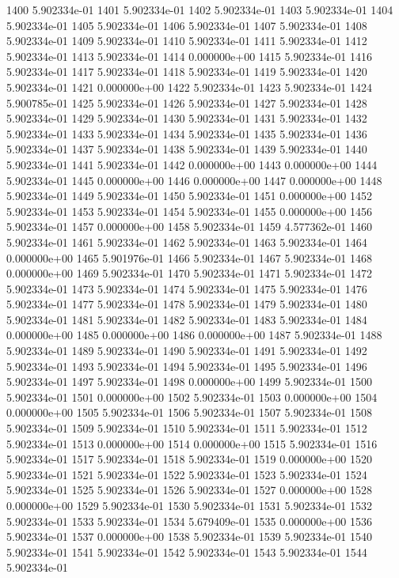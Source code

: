 \documentclass{article}
\begin{document}
\begin{Schunk}
\begin{Soutput}
1400 5.902334e-01
1401 5.902334e-01
1402 5.902334e-01
1403 5.902334e-01
1404 5.902334e-01
1405 5.902334e-01
1406 5.902334e-01
1407 5.902334e-01
1408 5.902334e-01
1409 5.902334e-01
1410 5.902334e-01
1411 5.902334e-01
1412 5.902334e-01
1413 5.902334e-01
1414 0.000000e+00
1415 5.902334e-01
1416 5.902334e-01
1417 5.902334e-01
1418 5.902334e-01
1419 5.902334e-01
1420 5.902334e-01
1421 0.000000e+00
1422 5.902334e-01
1423 5.902334e-01
1424 5.900785e-01
1425 5.902334e-01
1426 5.902334e-01
1427 5.902334e-01
1428 5.902334e-01
1429 5.902334e-01
1430 5.902334e-01
1431 5.902334e-01
1432 5.902334e-01
1433 5.902334e-01
1434 5.902334e-01
1435 5.902334e-01
1436 5.902334e-01
1437 5.902334e-01
1438 5.902334e-01
1439 5.902334e-01
1440 5.902334e-01
1441 5.902334e-01
1442 0.000000e+00
1443 0.000000e+00
1444 5.902334e-01
1445 0.000000e+00
1446 0.000000e+00
1447 0.000000e+00
1448 5.902334e-01
1449 5.902334e-01
1450 5.902334e-01
1451 0.000000e+00
1452 5.902334e-01
1453 5.902334e-01
1454 5.902334e-01
1455 0.000000e+00
1456 5.902334e-01
1457 0.000000e+00
1458 5.902334e-01
1459 4.577362e-01
1460 5.902334e-01
1461 5.902334e-01
1462 5.902334e-01
1463 5.902334e-01
1464 0.000000e+00
1465 5.901976e-01
1466 5.902334e-01
1467 5.902334e-01
1468 0.000000e+00
1469 5.902334e-01
1470 5.902334e-01
1471 5.902334e-01
1472 5.902334e-01
1473 5.902334e-01
1474 5.902334e-01
1475 5.902334e-01
1476 5.902334e-01
1477 5.902334e-01
1478 5.902334e-01
1479 5.902334e-01
1480 5.902334e-01
1481 5.902334e-01
1482 5.902334e-01
1483 5.902334e-01
1484 0.000000e+00
1485 0.000000e+00
1486 0.000000e+00
1487 5.902334e-01
1488 5.902334e-01
1489 5.902334e-01
1490 5.902334e-01
1491 5.902334e-01
1492 5.902334e-01
1493 5.902334e-01
1494 5.902334e-01
1495 5.902334e-01
1496 5.902334e-01
1497 5.902334e-01
1498 0.000000e+00
1499 5.902334e-01
1500 5.902334e-01
1501 0.000000e+00
1502 5.902334e-01
1503 0.000000e+00
1504 0.000000e+00
1505 5.902334e-01
1506 5.902334e-01
1507 5.902334e-01
1508 5.902334e-01
1509 5.902334e-01
1510 5.902334e-01
1511 5.902334e-01
1512 5.902334e-01
1513 0.000000e+00
1514 0.000000e+00
1515 5.902334e-01
1516 5.902334e-01
1517 5.902334e-01
1518 5.902334e-01
1519 0.000000e+00
1520 5.902334e-01
1521 5.902334e-01
1522 5.902334e-01
1523 5.902334e-01
1524 5.902334e-01
1525 5.902334e-01
1526 5.902334e-01
1527 0.000000e+00
1528 0.000000e+00
1529 5.902334e-01
1530 5.902334e-01
1531 5.902334e-01
1532 5.902334e-01
1533 5.902334e-01
1534 5.679409e-01
1535 0.000000e+00
1536 5.902334e-01
1537 0.000000e+00
1538 5.902334e-01
1539 5.902334e-01
1540 5.902334e-01
1541 5.902334e-01
1542 5.902334e-01
1543 5.902334e-01
1544 5.902334e-01

\end{Soutput}
\end{Schunk}
\end{document}
